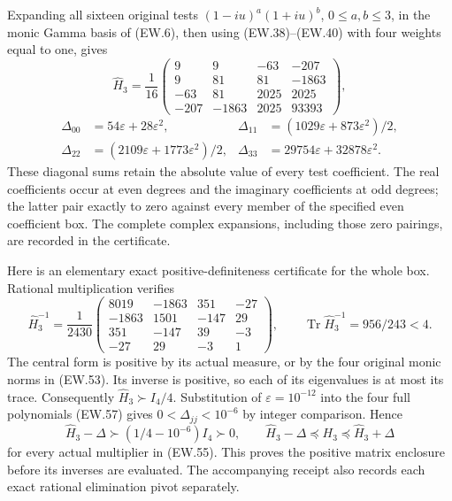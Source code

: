 \documentclass[11pt]{article}
\newcommand{\Tr}{\operatorname{Tr}}
\begin{document}
Expanding all sixteen original tests $(1-iu)^a(1+iu)^b$,
$0\le a,b\le3$, in the monic Gamma basis of (EW.6), then using
(EW.38)--(EW.40) with four weights equal to one, gives
\[
 \widehat H_3=\frac1{16}\begin{pmatrix}
 9&9&-63&-207\\9&81&81&-1863\\
 -63&81&2025&2025\\-207&-1863&2025&93393
 \end{pmatrix},
\]
\[
 \begin{aligned}
 \Delta_{00}&=54\varepsilon+28\varepsilon^2,&
 \Delta_{11}&=(1029\varepsilon+873\varepsilon^2)/2,\\
 \Delta_{22}&=(2109\varepsilon+1773\varepsilon^2)/2,&
 \Delta_{33}&=29754\varepsilon+32878\varepsilon^2.
 \end{aligned}                                                 \tag{EW.57}
\]
These diagonal sums retain the absolute value of every test
coefficient. The real coefficients occur at even degrees and the
imaginary coefficients at odd degrees; the latter pair exactly to
zero against every member of the specified even coefficient box.
The complete complex expansions, including those zero pairings,
are recorded in the certificate.

Here is an elementary exact positive-definiteness certificate for
the whole box. Rational multiplication verifies
\[
 \widehat H_3^{-1}=\frac1{2430}\begin{pmatrix}
 8019&-1863&351&-27\\-1863&1501&-147&29\\
 351&-147&39&-3\\-27&29&-3&1
 \end{pmatrix},\qquad \Tr\widehat H_3^{-1}=956/243<4.
\]
The central form is positive by its actual measure, or by the
four original monic norms in (EW.53). Its inverse is positive,
so each of its eigenvalues is at most its trace. Consequently
$\widehat H_3\succ I_4/4$.
Substitution of $\varepsilon=10^{-12}$ into the four full
polynomials (EW.57) gives $0<\Delta_{jj}<10^{-6}$ by integer
comparison. Hence
\[
 \widehat H_3-\Delta\succ(1/4-10^{-6})I_4\succ0,
 \qquad
 \widehat H_3-\Delta\preceq H_3\preceq\widehat H_3+\Delta
                                                               \tag{EW.58}
\]
for every actual multiplier in (EW.55). This proves the positive
matrix enclosure before its inverses are evaluated. The accompanying
receipt also records each exact rational elimination pivot separately.
\end{document}
